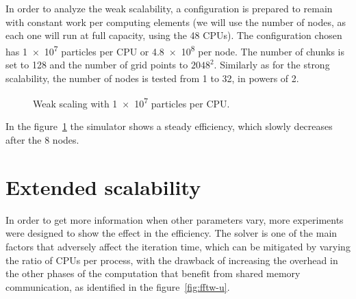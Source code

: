 In order to analyze the weak scalability, a configuration is prepared to remain 
with constant work per computing elements (we will use the number of nodes, as 
each one will run at full capacity, using the 48 CPUs). The configuration chosen 
has \num{1e7} particles per CPU or \num{4.8e8} per node. The number of chunks is 
set to 128 and the number of grid points to $2048^2$. Similarly as for the 
strong scalability, the number of nodes is tested from 1 to 32, in powers of 2.
%
\begin{figure}%
\centering
{}
\caption{Weak scaling with \num{1e7} particles per CPU.}
\label{fig:weak-scaling}
\end{figure}%
%
In the figure~\ref{fig:weak-scaling} the simulator shows a steady efficiency, 
which slowly decreases after the 8 nodes.


\section{Extended scalability}

In order to get more information when other parameters vary, more experiments 
were designed to show the effect in the efficiency. The solver is one of the 
main factors that adversely affect the iteration time, which can be mitigated by 
varying the ratio of CPUs per process, with the drawback of increasing the 
overhead in the other phases of the computation that benefit from shared memory 
communication, as identified in the figure~\ref{fig:fftw-u}.


